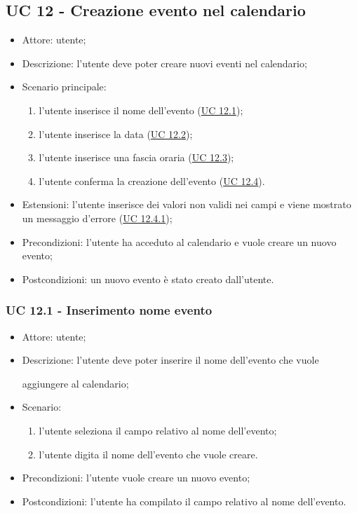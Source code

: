 

\subsection{UC 12 - Creazione evento nel calendario}
\begin{itemize}
    \item Attore: utente;
    \item Descrizione: l'utente deve poter creare nuovi eventi nel calendario;
    \item Scenario principale:
        \begin{enumerate}
        \item l'utente inserisce il nome dell'evento (\hyperref[sec: UC 12.1]{UC 12.1});
        \item l'utente inserisce la data (\hyperref[sec: UC 12.2]{UC 12.2});
        \item l'utente inserisce una fascia oraria (\hyperref[sec: UC 12.3]{UC 12.3});
        \item l'utente conferma la creazione dell'evento (\hyperref[sec: UC 12.4]{UC 12.4}).
        \end{enumerate}
    \item Estensioni: l'utente inserisce dei valori non validi nei campi e viene mostrato un messaggio d'errore (\hyperref[sec: UC 12.4.1]{UC 12.4.1});
    \item Precondizioni: l'utente ha acceduto al calendario e vuole creare un nuovo evento;
    \item Postcondizioni: un nuovo evento è stato creato dall'utente.
\end{itemize}

\subsubsection{UC 12.1 - Inserimento nome evento} \label{sec: UC 12.1}
\begin{itemize}
    \item Attore: utente;
    \item Descrizione: l'utente deve poter inserire il nome dell'evento che vuole \par aggiungere al calendario;
    \item Scenario:
        \begin{enumerate}
        \item l'utente seleziona il campo relativo al nome dell'evento;
        \item l'utente digita il nome dell'evento che vuole creare.
        \end{enumerate}
    
    \item Precondizioni: l'utente vuole creare un nuovo evento;
    \item Postcondizioni: l'utente ha compilato il campo relativo al nome dell'evento.
\end{itemize}


